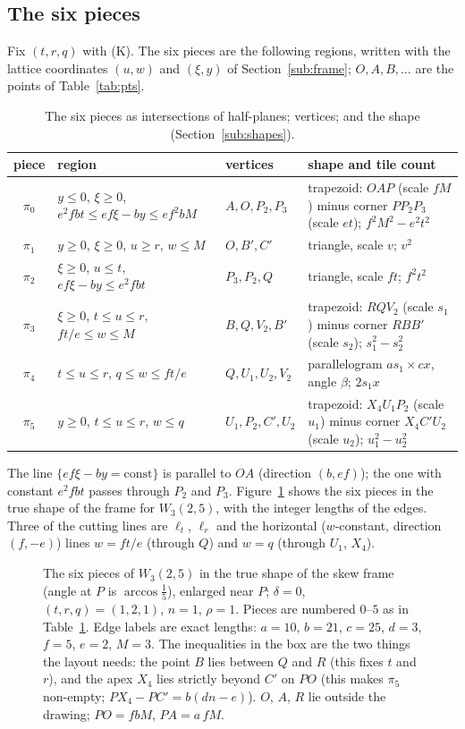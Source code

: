 \documentclass[11pt,reqno]{amsart}
\theoremstyle{plain}
\theoremstyle{definition}
\begin{document}
\subsection{The six pieces}\label{sub:pieces}
Fix $(t,r,q)$ with (K). The six pieces are the following regions, written with the lattice coordinates $(u,w)$ and $(\xi,y)$ of Section~\ref{sub:frame}; $O,A,B,\dots$ are the points of Table~\ref{tab:pts}.
\begin{table}[ht]
\centering\small
\caption{The six pieces as intersections of half-planes; vertices; and the shape (Section~\ref{sub:shapes}).}\label{tab:pieces}
\begin{tabular}{@{}cp{4.9cm}p{2.5cm}p{3.6cm}@{}}
\toprule
piece & region & vertices & shape and tile count\\
\midrule
$\pi_0$ & $y\le0$, $\xi\ge0$, $e^2fbt\le ef\xi-by\le ef^2bM$ & $A,O,P_2,P_3$ & trapezoid: $OAP$ (scale $fM$) minus corner $PP_2P_3$ (scale $et$); $f^2M^2-e^2t^2$\\
$\pi_1$ & $y\ge0$, $\xi\ge0$, $u\ge r$, $w\le M$ & $O,B',C'$ & triangle, scale $v$; $v^2$\\
$\pi_2$ & $\xi\ge0$, $u\le t$, $ef\xi-by\le e^2fbt$ & $P_3,P_2,Q$ & triangle, scale $ft$; $f^2t^2$\\
$\pi_3$ & $\xi\ge0$, $t\le u\le r$, $ft/e\le w\le M$ & $B,Q,V_2,B'$ & trapezoid: $RQV_2$ (scale $s_1$) minus corner $RBB'$ (scale $s_2$); $s_1^2-s_2^2$\\
$\pi_4$ & $t\le u\le r$, $q\le w\le ft/e$ & $Q,U_1,U_2,V_2$ & parallelogram $as_1\times cx$, angle $\beta$; $2s_1x$\\
$\pi_5$ & $y\ge0$, $t\le u\le r$, $w\le q$ & $U_1,P_2,C',U_2$ & trapezoid: $X_4U_1P_2$ (scale $u_1$) minus corner $X_4C'U_2$ (scale $u_2$); $u_1^2-u_2^2$\\
\bottomrule
\end{tabular}
\end{table}
The line $\{ef\xi-by=\text{const}\}$ is parallel to $OA$ (direction $(b,ef)$); the one with constant $e^2fbt$ passes through $P_2$ and $P_3$.
Figure~\ref{fig:frame} shows the six pieces in the true shape of the frame for $W_3(2,5)$, with the integer lengths of the edges. Three of the cutting lines are $\ell_t$, $\ell_r$ and the horizontal ($w$-constant, direction $(f,-e)$) lines $w=ft/e$ (through $Q$) and $w=q$ (through $U_1$, $X_4$).
\begin{figure}[ht]
\centering

\caption{The six pieces of $W_3(2,5)$ in the true shape of the skew frame (angle at $P$ is $\arccos\frac15$), enlarged near $P$; $\delta=0$, $(t,r,q)=(1,2,1)$, $n=1$, $\rho=1$. Pieces are numbered $0$--$5$ as in Table~\ref{tab:pieces}. Edge labels are exact lengths: $a=10$, $b=21$, $c=25$, $d=3$, $f=5$, $e=2$, $M=3$. The inequalities in the box are the two things the layout needs: the point $B$ lies between $Q$ and $R$ (this fixes $t$ and $r$), and the apex $X_4$ lies strictly beyond $C'$ on $PO$ (this makes $\pi_5$ non-empty; $PX_4-PC'=b(dn-e)$). $O$, $A$, $R$ lie outside the drawing; $PO=fbM$, $PA=a\,fM$.}\label{fig:frame}
\end{figure}
\end{document}
